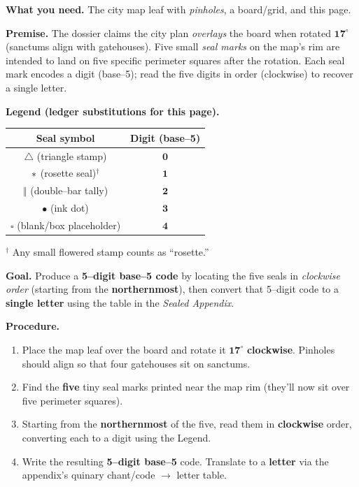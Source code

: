 \documentclass[11pt]{article}
\begin{document}
\begin{itemize}
\noindent\textbf{What you need.} The city map leaf with \emph{pinholes}, a board/grid, and this page.

\medskip
\noindent\textbf{Premise.} The dossier claims the city plan \emph{overlays} the board when rotated \(\mathbf{17^\circ}\) (sanctums align with gatehouses). Five small \emph{seal marks} on the map’s rim are intended to land on five specific perimeter squares after the rotation. Each seal mark encodes a digit (base–5); read the five digits in order (clockwise) to recover a single letter.

\medskip
\noindent\textbf{Legend (ledger substitutions for this page).}
\begin{center}
\begin{tabular}{c|c}
\textbf{Seal symbol} & \textbf{Digit (base–5)} \\
\hline
\(\triangle\) (triangle stamp) & \(\mathbf{0}\) \\
\(\large\ast\) (rosette seal)\(^\dagger\) & \(\mathbf{1}\) \\
\(\Vert\) (double–bar tally) & \(\mathbf{2}\) \\
\(\bullet\) (ink dot) & \(\mathbf{3}\) \\
\(\square\) (blank/box placeholder) & \(\mathbf{4}\) \\
\end{tabular}
\end{center}
\noindent\(^\dagger\) Any small flowered stamp counts as “rosette.”

\medskip
\noindent\textbf{Goal.} Produce a \textbf{5–digit base–5 code} by locating the five seals in \emph{clockwise order} (starting from the \textbf{northernmost}), then convert that 5–digit code to a \textbf{single letter} using the table in the \emph{Sealed Appendix}.

\medskip
\noindent\textbf{Procedure.}
\begin{enumerate}\setlength\itemsep{0.2em}
  \item Place the map leaf over the board and rotate it \(\mathbf{17^\circ}\) \textbf{clockwise}. Pinholes should align so that four gatehouses sit on sanctums.
  \item Find the \textbf{five} tiny seal marks printed near the map rim (they’ll now sit over five perimeter squares).
  \item Starting from the \textbf{northernmost} of the five, read them in \textbf{clockwise} order, converting each to a digit using the Legend.
  \item Write the resulting \textbf{5–digit base–5} code. Translate to a \textbf{letter} via the appendix’s quinary chant/code \(\rightarrow\) letter table.
\end{enumerate}


\end{itemize}
\end{document}
